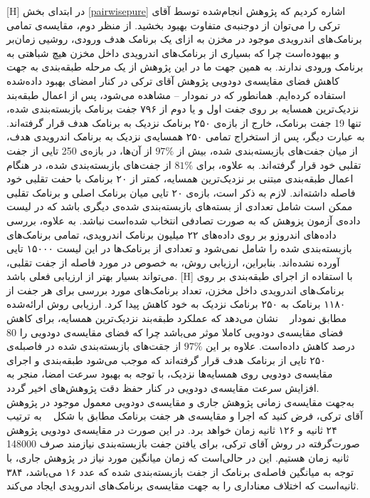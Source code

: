     [H]
 \vspace{1em}
 در ابتدای بخش 
 \ref{pairwisepure}
 اشاره‌ کردیم که پژوهش انجام‌شده توسط آقای ترکی را می‌توان از دوجنبه‌ی متفاوت بهبود بخشید. از منظر دوم، مقایسه‌ی تمامی برنامک‌های اندرویدی موجود در مخزن به ازای یک برنامک هدف ورودی، روشیی زمان‌بر و بیهوده‌است چرا که بسیاری از برنامک‌های اندرویدی داخل مخزن هیچ‌ شباهتی به برنامک ورودی ندارند. به همین جهت ما در این پژوهش از یک مرحله‌ طبقه‌بندی به جهت کاهش فضای مقایسه‌ی دودویی پژوهش آقای ترکی در کنار امضای بهبود داده‌شده استفاده کرده‌ایم. همانطور که در نمودار -- مشاهده می‌شود، پس از اعمال طبقه‌بند نزدیک‌ترین همسایه بر روی جفت اول و یا دوم از ۷۹۶ جفت برنامک بازبسته‌بندی شده، تنها 19 جفت برنامک، خارج از بازه‌ی ۲۵۰ برنامک نزدیک به برنامک هدف قرار گرفته‌اند. به عبارت دیگر، پس از استخراج تمامی ۲۵۰ همسایه‌ی نزدیک به برنامک اندرویدی هدف، از میان جفت‌های بازبسته‌بندی شده، بیش از $97\%$ از آن‌ها،  در بازه‌ی 250 تایی از جفت تقلبی خود قرار گرفته‌اند. به علاوه، برای  $81\%$ از جفت‌های بازبسته‌بندی شده، در هنگام اعمال طبقه‌بندی مبتنی بر نزدیک‌ترین همسایه، کمتر از ۲۰ برنامک با حفت تقلبی خود فاصله داشته‌اند. لازم به ذکر است، بازه‌ی ۲۰ تایی میان برنامک اصلی و برنامک تقلبی ممکن است شامل تعدادی از بسته‌های بازبسته‌بندی شده‌ی دیگری باشد که در لیست داده‌ی آزمون پزوهش که به صورت تصادفی انتخاب شده‌است نباشد. به علاوه، بررسی داده‌های اندروزو بر روی داده‌‌های ۲۲ میلیون برنامک اندرویدی، تمامی برنامک‌های بازبسته‌بندی شده را شامل نمی‌شود و تعدادی از برنامک‌ها در این لیست ۱۵۰۰۰ تایی آورده نشده‌اند. بنابراین، ارزیابی روش، به خصوص در مورد فاصله از جفت تقلبی، می‌تواند بسیار بهتر از ارزیابی فعلی باشد. 
     [H]
 \vspace{1em}
با استفاده از اجرای طبقه‌بندی بر روی برنامک‌های اندرویدی داخل مخزن، تعداد برنامک‌های مورد بررسی برای هر جفت از ۱۱۸۰ برنامک به ۲۵۰ برنامک نزدیک به خود کاهش پیدا کرد. ارزیابی روش ارائه‌شده مطابق نمودار ~ نشان می‌دهد که عملکرد طبقه‌بند نزدیک‌ترین همسایه، برای کاهش فضای مقایسه‌ی دودویی کاملا موثر می‌باشد چرا که فضای مقایسه‌ی دودویی را 80 درصد کاهش داده‌است. علاوه‌ بر این $97\%$ از جقت‌های بازبسته‌بندی شده در فاصبله‌ی ۲۵۰ تایی از برنامک هدف قرار گرفته‌اند که موجب می‌شود طبقه‌بندی و اجرای مقایسه‌ی دودویی روی همسایه‌ها نزدیک، با توجه به بهبود سرعت امضا، منجر به افزایش سرعت مقایسه‌ی دودویی در کنار حفظ دقت پژوهش‌های اخیر گردد. \\
به‌جهت مقایسه‌ی زمانی پژوهش جاری و مقایسه‌ی دودویی معمول موجود در پژوهش آقای ترکی، فرض کنید که اجرا و مقایسه‌ی هر جفت برنامک مطابق با شکل ~  به ترتیب ۲۴ ثانیه و ۱۲۶ ثانیه زمان خواهد برد. در این صورت در مقایسه‌ی دودویی پژوهش صورت‌گرفته در روش آقای ترکی، برای یافتن جفت بازبسته‌بندی نیازمند صرف 148000 ثانیه زمان هستیم. این در حالی‌است که زمان میانگین مورد نیاز در پژوهش جاری، با توجه به میانگین فاصله‌ی برنامک از جفت بازبسته‌بندی شده که عدد ۱۶ می‌باشد، ۳۸۴ ثانیه‌است که اختلاف معناداری را به جهت مقایسه‌ی برنامک‌های اندرویدی ایجاد می‌کند. 
